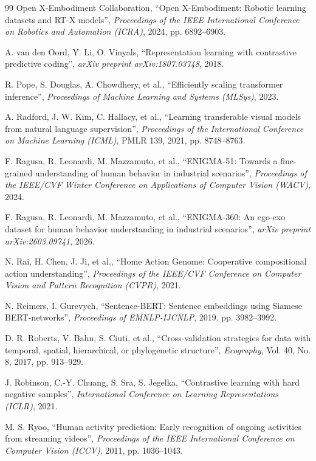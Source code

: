 \documentclass[a4paper,oneside]{report}
\begin{document}
{\begin{thebibliography}{99}
Open X-Embodiment Collaboration, ``Open X-Embodiment: Robotic learning datasets and RT-X models'', \emph{Proceedings of the IEEE International Conference on Robotics and Automation (ICRA)}, 2024, pp. 6892--6903.

A. van den Oord, Y. Li, O. Vinyals, ``Representation learning with contrastive predictive coding'', \emph{arXiv preprint arXiv:1807.03748}, 2018.

R. Pope, S. Douglas, A. Chowdhery, et al., ``Efficiently scaling transformer inference'', \emph{Proceedings of Machine Learning and Systems (MLSys)}, 2023.

A. Radford, J. W. Kim, C. Hallacy, et al., ``Learning transferable visual models from natural language supervision'', \emph{Proceedings of the International Conference on Machine Learning (ICML)}, PMLR 139, 2021, pp. 8748--8763.

F. Ragusa, R. Leonardi, M. Mazzamuto, et al., ``ENIGMA-51: Towards a fine-grained understanding of human behavior in industrial scenarios'', \emph{Proceedings of the IEEE/CVF Winter Conference on Applications of Computer Vision (WACV)}, 2024.

F. Ragusa, R. Leonardi, M. Mazzamuto, et al., ``ENIGMA-360: An ego-exo dataset for human behavior understanding in industrial scenarios'', \emph{arXiv preprint arXiv:2603.09741}, 2026.

N. Rai, H. Chen, J. Ji, et al., ``Home Action Genome: Cooperative compositional action understanding'', \emph{Proceedings of the IEEE/CVF Conference on Computer Vision and Pattern Recognition (CVPR)}, 2021.

N. Reimers, I. Gurevych, ``Sentence-BERT: Sentence embeddings using Siamese BERT-networks'', \emph{Proceedings of EMNLP-IJCNLP}, 2019, pp. 3982--3992.

D. R. Roberts, V. Bahn, S. Ciuti, et al., ``Cross-validation strategies for data with temporal, spatial, hierarchical, or phylogenetic structure'', \emph{Ecography}, Vol. 40, No. 8, 2017, pp. 913--929.

J. Robinson, C.-Y. Chuang, S. Sra, S. Jegelka, ``Contrastive learning with hard negative samples'', \emph{International Conference on Learning Representations (ICLR)}, 2021.

M. S. Ryoo, ``Human activity prediction: Early recognition of ongoing activities from streaming videos'', \emph{Proceedings of the IEEE International Conference on Computer Vision (ICCV)}, 2011, pp. 1036--1043.


\end{thebibliography}}
\end{document}
